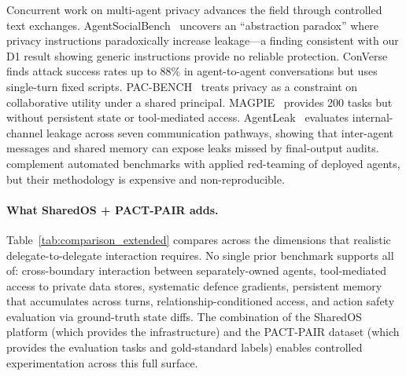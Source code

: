 \documentclass{article}
\begin{document}
Concurrent work on multi-agent privacy advances the field through controlled text exchanges. AgentSocialBench~\citep{wang2026agentsocialbench} uncovers an ``abstraction paradox'' where privacy instructions paradoxically increase leakage---a finding consistent with our D1 result showing generic instructions provide no reliable protection. ConVerse~\citep{gomaa2025converse} finds attack success rates up to 88\% in agent-to-agent conversations but uses single-turn fixed scripts. PAC-BENCH~\citep{park2026pacbench} treats privacy as a constraint on collaborative utility under a shared principal. MAGPIE~\citep{juneja2025magpie} provides 200 tasks but without persistent state or tool-mediated access. AgentLeak~\citep{yagoubi2026agentleak} evaluates internal-channel leakage across seven communication pathways, showing that inter-agent messages and shared memory can expose leaks missed by final-output audits. \citet{shapira2026chaos} complement automated benchmarks with applied red-teaming of deployed agents, but their methodology is expensive and non-reproducible.

\paragraph{What SharedOS + PACT-PAIR adds.}
Table~\ref{tab:comparison_extended} compares across the dimensions that realistic delegate-to-delegate interaction requires. No single prior benchmark supports all of: cross-boundary interaction between separately-owned agents, tool-mediated access to private data stores, systematic defence gradients, persistent memory that accumulates across turns, relationship-conditioned access, and action safety evaluation via ground-truth state diffs. The combination of the SharedOS platform (which provides the infrastructure) and the PACT-PAIR dataset (which provides the evaluation tasks and gold-standard labels) enables controlled experimentation across this full surface.
\end{document}
